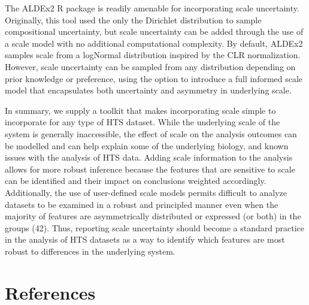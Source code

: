 \documentclass[
]{article}
\begin{document}
The ALDEx2 R package is readily amenable for incorporating scale
uncertainty. Originally, this tool used the only the Dirichlet
distribution to sample compositional uncertainty, but scale uncertainty
can be added through the use of a scale model with no additional
computational complexity. By default, ALDEx2 samples scale from a
logNormal distribution inspired by the CLR normalization. However, scale
uncertainty can be sampled from any distribution depending on prior
knowledge or preference, using the option to introduce a full informed
scale model that encapsulates both uncertainty and asymmetry in
underlying scale.

In summary, we supply a toolkit that makes incorporating scale simple to
incorporate for any type of HTS dataset. While the underlying scale of
the system is generally inaccessible, the effect of scale on the
analysis outcomes can be modelled and can help explain some of the
underlying biology, and known issues with the analysis of HTS data.
Adding scale information to the analysis allows for more robust
inference because the features that are sensitive to scale can be
identified and their impact on conclusions weighted accordingly.
Additionally, the use of user-defined scale models permits difficult to
analyze datasets to be examined in a robust and principled manner even
when the majority of features are asymmetrically distributed or
expressed (or both) in the groups (42). Thus, reporting scale
uncertainty should become a standard practice in the analysis of HTS
datasets as a way to identify which features are most robust to
differences in the underlying system.

\section*{References}\label{references}
\end{document}
